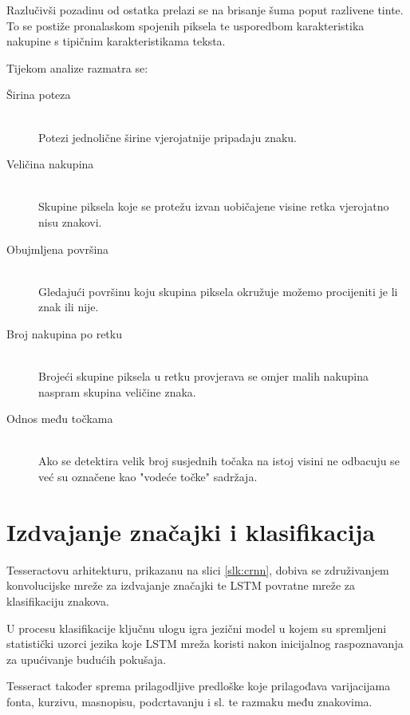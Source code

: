 \documentclass[zavrsnirad]{fer}
\begin{document}
Razlučivši pozadinu od ostatka prelazi se na brisanje šuma poput razlivene tinte. To se postiže pronalaskom spojenih piksela te usporedbom karakteristika nakupine s tipičnim karakteristikama teksta.

Tijekom analize razmatra se: \cite{Tesseract}

\begin{description}
	\item[Širina poteza] \hfill \\ Potezi jednolične širine vjerojatnije pripadaju znaku.
	\item[Veličina nakupina] \hfill \\ Skupine piksela koje se protežu izvan uobičajene visine retka vjerojatno nisu znakovi.
	\item[Obujmljena površina] \hfill \\ Gledajući površinu koju skupina piksela okružuje možemo procijeniti je li znak ili nije.
	\item[Broj nakupina po retku] \hfill \\ Brojeći skupine piksela u retku provjerava se omjer malih nakupina naspram skupina veličine znaka.
 	\item[Odnos među točkama] \hfill \\ Ako se detektira velik broj susjednih točaka na istoj visini ne odbacuju se već su označene kao "vodeće točke" sadržaja.
\end{description}

\section{Izdvajanje značajki i klasifikacija}

 Tesseractovu arhitekturu, prikazanu na slici \ref{slk:crnn}, dobiva se združivanjem konvolucijske mreže za izdvajanje značajki te LSTM povratne mreže za klasifikaciju znakova.
 
 U procesu klasifikacije ključnu ulogu igra jezični model u kojem su spremljeni statistički uzorci jezika koje LSTM mreža koristi nakon inicijalnog raspoznavanja za upućivanje budućih pokušaja.
 
 Tesseract također sprema prilagodljive predloške koje prilagođava varijacijama fonta, kurzivu, masnopisu, podcrtavanju i sl. te razmaku među znakovima.
\end{document}
